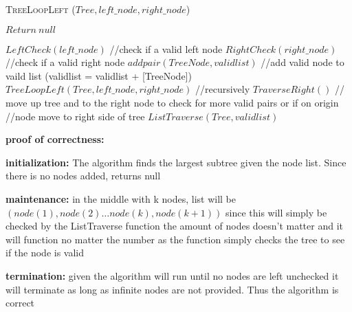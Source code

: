 \documentclass{article}
\begin{document}
\begin{algorithm} \caption{\textsc{TreeLoopLeft} ($Tree,left\_node,right\_node$)}\label{alg:seb}
    \begin{algorithmic}[1]
            \State$Return\ null$
        \EndIf{}

        \State$LeftCheck(left\_node)$ //check if a valid left node
        \State$RightCheck(right\_node)$ //check if a valid right node
        \State$addpair(TreeNode, validlist)$ //add valid node to vaild list (validlist = validlist + [TreeNode])
            \State$TreeLoopLeft(Tree,left\_node,right\_node)$ //recursively
            \Else{}
            \State$TraverseRight()$ // move up tree and to the right node to check for more valid pairs or if on origin 							       //node move to right side of tree
        \EndIf{}
        \State$ListTraverse(Tree, validlist)$
    \end{algorithmic}
\end{algorithm}

{ \bf proof of correctness:}

{\bf initialization: } The algorithm finds the largest subtree given the node list. Since there is no nodes added, returns null

{\bf  maintenance:} in the middle with k nodes, list will be $(node(1), node(2) \dots node(k),node(k+1))$ since this will simply be checked by the ListTraverse function the amount of nodes doesn't matter and it will function no matter the number as the function simply checks the tree to see if the node is valid

{\bf termination: } given the algorithm will run until no nodes are left unchecked it will terminate as long as infinite nodes are not provided. Thus the algorithm is correct
\end{document}
